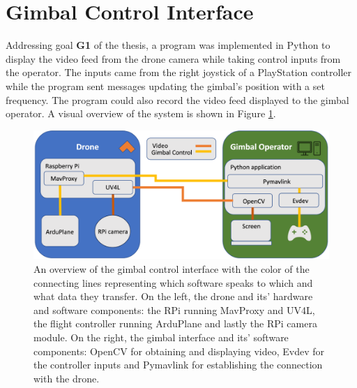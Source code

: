 \documentclass[nofilelist]{cslthse-msc}
\begin{document}
\section{Gimbal Control Interface}
Addressing goal \textbf{G1} of the thesis, a program was implemented in Python to display the video feed from the drone camera while taking control inputs from the operator. The inputs came from the right joystick of a PlayStation controller while the program sent messages updating the gimbal's position with a set frequency. The program could also record the video feed displayed to the gimbal operator. A visual overview of the system is shown in Figure \ref{fig:system-overview}.
\begin{figure}[!hbt]
   \centering
   \includegraphics[scale=0.25]{images/system-overview.png} 
   \caption{An overview of the gimbal control interface with the color of the connecting lines representing which software speaks to which and what data they transfer. On the left, the drone and its' hardware and software components: the RPi running MavProxy and UV4L, the flight controller running ArduPlane and lastly the RPi camera module. On the right, the gimbal interface and its' software components: OpenCV for obtaining and displaying video, Evdev for the controller inputs and Pymavlink for establishing the connection with the drone. }
   \label{fig:system-overview}
\end{figure}
\end{document}
